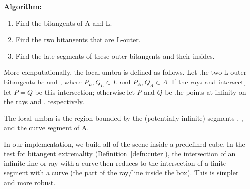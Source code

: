 \documentclass[9pt]{article}
\begin{document}
{\bf Algorithm:}
\begin{enumerate}
\item Find the bitangents of A and L.
\item Find the two bitangents that are L-outer.
\item Find the late segments of these outer bitangents and their insides.
\end{enumerate}


\begin{rmk}
More computationally, the local umbra is defined as follows.
Let the two L-outer bitangents be  and ,
where $P_L,Q_L \in L$ and $P_A,Q_A \in A$.
If the rays  and  intersect,
let $P=Q$ be this intersection;
otherwise let $P$ and $Q$ be the points 
at infinity on the rays  and , respectively.

The local umbra is the region bounded by the (potentially infinite)
segments , ,
and the curve segment  of A.
\end{rmk}

\begin{implementation}
In our implementation, we build all of the scene inside a predefined cube.
In the test for bitangent extremality (Definition~\ref{defn:outer}),
the intersection of an infinite line or ray
with a curve then reduces to the intersection of a finite segment with a curve
(the part of the ray/line inside the box).
This is simpler and more robust.
\end{implementation}
\fi



\end{document}
